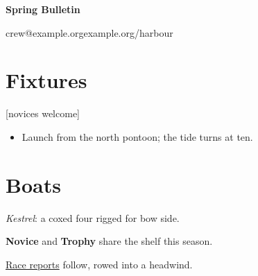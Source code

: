 \documentclass[paper=a5,fontsize=11pt]{scrartcl}
\newlength{\stroke}
\newcommand{\boat}[2]{\textit{#1}: #2.\par}
\begin{document}
\color{deepwater}

\begin{center}
    {\LARGE\sffamily\bfseries Spring \textcolor{driftwood}{Bulletin}\par}
    \vspace{2\stroke}
    {\color{driftwood} crew@example.org\boatsep example.org/harbour}
\end{center}

\section*{Fixtures}

[novices welcome]

\begin{itemize}
    \item Launch from the north pontoon; the tide turns at ten.
\end{itemize}

\vspace{2\stroke}

\section*{Boats}

\boat{Kestrel}{a coxed four rigged for bow side}

\noindent\textbf{Novice\vphantom{gj}} and \textbf{Trophy} share the shelf this season.\par

\ul{Race reports} follow, rowed  into a headwind.
\end{document}
